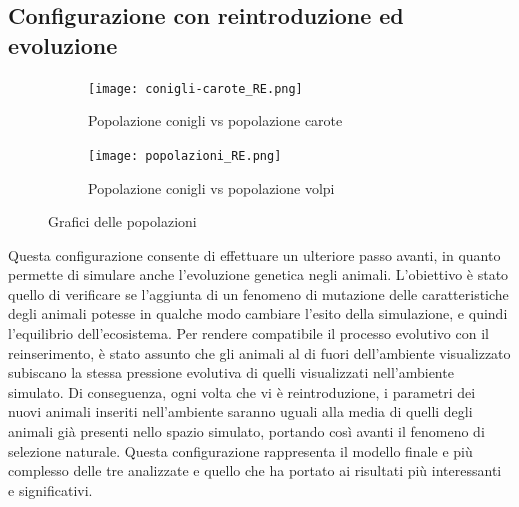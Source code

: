 \documentclass[11pt]{article}
\begin{document}
\newpage


\subsection{Configurazione con reintroduzione ed evoluzione}

\begin{figure}[h!]
	\begin{subfigure}{\textwidth}
    \centering
     \texttt{[image: conigli-carote\_RE.png]}
     \caption{Popolazione conigli vs popolazione carote}
     \label{fig:conigliCaroteRE}
	\end{subfigure}
	\begin{subfigure}{\textwidth}
		\centering
     \texttt{[image: popolazioni\_RE.png]}
     \caption{Popolazione conigli vs popolazione volpi}
     \label{fig:conigliVolpiRE}
	\end{subfigure}
	 \caption{Grafici delle popolazioni}
\end{figure}

\newpage
\noindent Questa configurazione consente di effettuare un ulteriore passo avanti, in quanto permette di simulare anche l'evoluzione genetica negli animali. L'obiettivo è stato quello di verificare se l'aggiunta di un fenomeno di mutazione delle caratteristiche degli animali potesse in qualche modo cambiare l'esito della simulazione, e quindi l'equilibrio dell'ecosistema. Per rendere compatibile il processo evolutivo con il reinserimento, è stato assunto che gli animali al di fuori dell'ambiente visualizzato subiscano la stessa pressione evolutiva di quelli visualizzati nell'ambiente simulato. Di conseguenza, ogni volta che vi è reintroduzione, i parametri dei nuovi animali inseriti nell'ambiente saranno uguali alla media di quelli degli animali già presenti nello spazio simulato, portando così avanti il fenomeno di selezione naturale. Questa configurazione rappresenta il modello finale e più complesso delle tre analizzate e quello che ha portato ai risultati più interessanti e significativi.
\end{document}
